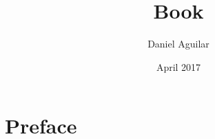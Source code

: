 
\title{Book}
\newpage
\author{Daniel Aguilar}
\date{April 2017}
\makeindex

\begin{titlepage}
\frontmatter
{}
\end{titlepage}
\null
\pagestyle{empty} %
\maketitle
\tableofcontents

\mainmatter


\chapter{Preface}
 \cleardoublepage
 \printindex

